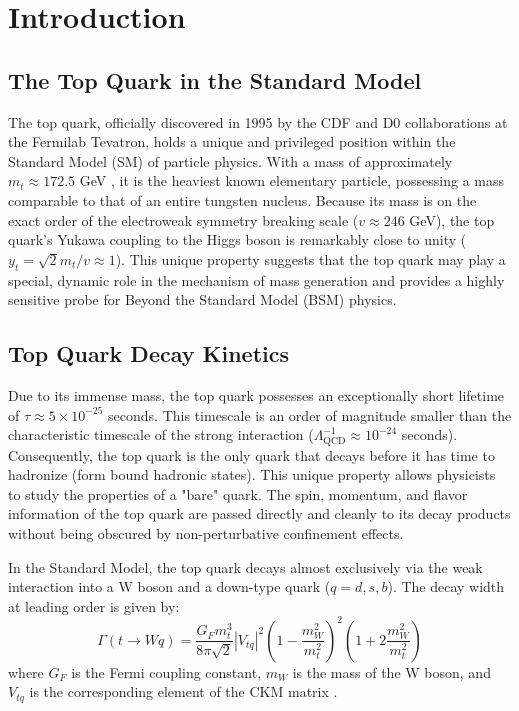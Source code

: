 \documentclass[11pt,a4paper]{article}
\begin{document}
\section{Introduction}

\subsection{The Top Quark in the Standard Model}
The top quark, officially discovered in 1995 by the CDF \cite{cdf_top} and D0 \cite{d0_top} collaborations at the Fermilab Tevatron, holds a unique and privileged position within the Standard Model (SM) of particle physics. With a mass of approximately $m_{t} \approx 172.5$ GeV \cite{pdg}, it is the heaviest known elementary particle, possessing a mass comparable to that of an entire tungsten nucleus. Because its mass is on the exact order of the electroweak symmetry breaking scale ($v \approx 246$ GeV), the top quark's Yukawa coupling to the Higgs boson is remarkably close to unity ($y_{t} = \sqrt{2}m_t / v \approx 1$). This unique property suggests that the top quark may play a special, dynamic role in the mechanism of mass generation and provides a highly sensitive probe for Beyond the Standard Model (BSM) physics.

\subsection{Top Quark Decay Kinetics}
Due to its immense mass, the top quark possesses an exceptionally short lifetime of $\tau \approx 5 \times 10^{-25}$ seconds. This timescale is an order of magnitude smaller than the characteristic timescale of the strong interaction ($\Lambda_{\text{QCD}}^{-1} \approx 10^{-24}$ seconds). Consequently, the top quark is the only quark that decays before it has time to hadronize (form bound hadronic states). This unique property allows physicists to study the properties of a "bare" quark. The spin, momentum, and flavor information of the top quark are passed directly and cleanly to its decay products without being obscured by non-perturbative confinement effects.

In the Standard Model, the top quark decays almost exclusively via the weak interaction into a W boson and a down-type quark ($q=d,s,b$). The decay width at leading order is given by:
\begin{equation}
\Gamma(t \rightarrow Wq) = \frac{G_{F}m_{t}^{3}}{8\pi\sqrt{2}} |V_{tq}|^{2} \left(1-\frac{m_{W}^{2}}{m_{t}^{2}}\right)^{2} \left(1+2\frac{m_{W}^{2}}{m_{t}^{2}}\right) \label{eq:width}
\end{equation}
where $G_{F}$ is the Fermi coupling constant, $m_{W}$ is the mass of the W boson, and $V_{tq}$ is the corresponding element of the CKM matrix \cite{pdg}.
\end{document}
